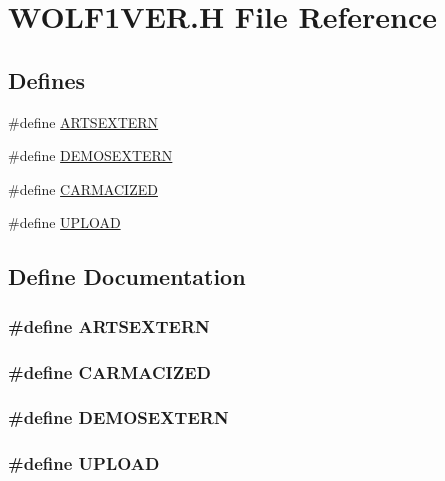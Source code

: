 \hypertarget{WOLF1VER_8H}{
\section{WOLF1VER.H File Reference}
\label{WOLF1VER_8H}
}
\subsection*{Defines}
\begin{DoxyCompactItemize}
\item 
\#define \hyperlink{WOLF1VER_8H_a36e8622d432bb1dcfc61ac233148b685}{ARTSEXTERN}
\item 
\#define \hyperlink{WOLF1VER_8H_aa38bbec192ab8931f108d382f7833c31}{DEMOSEXTERN}
\item 
\#define \hyperlink{WOLF1VER_8H_ab1d0a23b2e2640f4fbf73f30b3586f1b}{CARMACIZED}
\item 
\#define \hyperlink{WOLF1VER_8H_ae622bdcfd36d97e0d50a3e70150f53e0}{UPLOAD}
\end{DoxyCompactItemize}


\subsection{Define Documentation}
\hypertarget{WOLF1VER_8H_a36e8622d432bb1dcfc61ac233148b685}{
\subsubsection[{ARTSEXTERN}]{\setlength{\rightskip}{0pt plus 5cm}\#define ARTSEXTERN}}
\label{WOLF1VER_8H_a36e8622d432bb1dcfc61ac233148b685}
\hypertarget{WOLF1VER_8H_ab1d0a23b2e2640f4fbf73f30b3586f1b}{
\subsubsection[{CARMACIZED}]{\setlength{\rightskip}{0pt plus 5cm}\#define CARMACIZED}}
\label{WOLF1VER_8H_ab1d0a23b2e2640f4fbf73f30b3586f1b}
\hypertarget{WOLF1VER_8H_aa38bbec192ab8931f108d382f7833c31}{
\subsubsection[{DEMOSEXTERN}]{\setlength{\rightskip}{0pt plus 5cm}\#define DEMOSEXTERN}}
\label{WOLF1VER_8H_aa38bbec192ab8931f108d382f7833c31}
\hypertarget{WOLF1VER_8H_ae622bdcfd36d97e0d50a3e70150f53e0}{
\subsubsection[{UPLOAD}]{\setlength{\rightskip}{0pt plus 5cm}\#define UPLOAD}}
\label{WOLF1VER_8H_ae622bdcfd36d97e0d50a3e70150f53e0}
